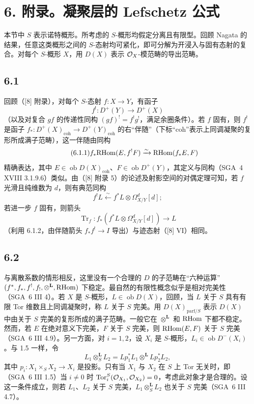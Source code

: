 \section*{6. 附录。凝聚层的 Lefschetz 公式}

本节中 $S$ 表示诺特概形。所考虑的 $S$-概形均假定分离且有限型。回顾 Nagata 的结果，任意这类概形之间的 $S$-态射均可紧化，即可分解为开浸入与固有态射的复合。对每个 $S$-概形 $X$，用 $D(X)$ 表示 $\mathcal{O}_X$-模范畴的导出范畴。

\subsection*{6.1}
回顾（[8] 附录），对每个 $S$-态射 $f:X\to Y$，有函子
\[
f^!:D^+(Y)\longrightarrow D^+(X)
\]
（以及对复合 $gf$ 的传递性同构 $(gf)^! = f^!g^!$，满足余圈条件）。若 $f$ 固有，则 $f^!$ 是函子 $f_*:D^+(X)_{\mathrm{coh}}\to D^+(Y)_{\mathrm{coh}}$ 的右“伴随”（下标“coh”表示上同调凝聚的复形所成满子范畴），这一伴随由同构
\begin{equation}
\tag{6.1.1}
f_*\mathrm{RHom}(E,f^!F)\xrightarrow{\sim}\mathrm{RHom}(f_*E,F)
\end{equation}
精确表达，其中 $E\in\operatorname{ob}D(X)_{\mathrm{coh}}$、$F\in\operatorname{ob}D^+(Y)$，其定义与同构（SGA~4 XVIII 3.1.9.6）类似。由（[8] 附录 5）的论述及射影空间的对偶定理可知，若 $f$ 光滑且纯维数为 $d$，则有典范同构
\begin{equation}
\tag{6.1.2}
f^!L\xleftarrow{\sim} f^*L\otimes\Omega^d_{X/Y}[d];
\end{equation}
若进一步 $f$ 固有，则箭头
\begin{equation}
\tag{6.1.3}
\operatorname{Tr}_f:f_*(f^*L\otimes\Omega^d_{X/Y}[d])\longrightarrow L
\end{equation}
（利用 6.1.2，由伴随箭头 $f_*f^!\to I$ 导出）与迹态射（[8] VI）相同。

\subsection*{6.2}
与离散系数的情形相反，这里没有一个合理的 $D$ 的子范畴在“六种运算” $(f^*,f_*,f^!,f_!,\otimes^{\mathbf L},\mathrm{RHom})$ 下稳定。最自然的有限性概念似乎是相对完美性（SGA~6 III 4）。若 $X$ 是 $S$-概形，$L\in\operatorname{ob}D(X)$，回顾，当 $L$ 关于 $S$ 具有有限 Tor 维数且上同调凝聚时，称 $L$ 关于 $S$ 完美。用 $D(X)_{\mathrm{parf}/S}$ 表示 $D(X)$ 中由关于 $S$ 完美的复形所成的满子范畴。一般它在 $\otimes^{\mathbf L}$ 和 $\mathrm{RHom}$ 下都不稳定。然而，若 $E$ 在绝对意义下完美，$F$ 关于 $S$ 完美，则 $\mathrm{RHom}(E,F)$ 关于 $S$ 完美（SGA~6 III 4.9）。另一方面，对 $i=1,2$，设 $X_i$ 是 $S$-概形，$L_i\in\operatorname{ob}D^{-}(X_i)$。与 1.5 一样，令
\[
L_1\otimes_S^{\mathbf L}L_2=Lp_1^*L_1\otimes^{\mathbf L}Lp_2^*L_2,
\]
其中 $p_i:X_1\times_SX_2\to X_i$ 是投影。只有当 $X_1$ 与 $X_2$ 在 $S$ 上 Tor 无关时，即（SGA~6 III 1.5）当 $i\ne0$ 时 $\operatorname{Tor}_i^S(\mathcal{O}_{X_1},\mathcal{O}_{X_2})=0$，考虑此对象才是合理的。设这一条件成立，则若 $L_1$、$L_2$ 关于 $S$ 完美，$L_1\otimes_S^{\mathbf L}L_2$ 也关于 $S$ 完美（SGA~6 III 4.7）。

